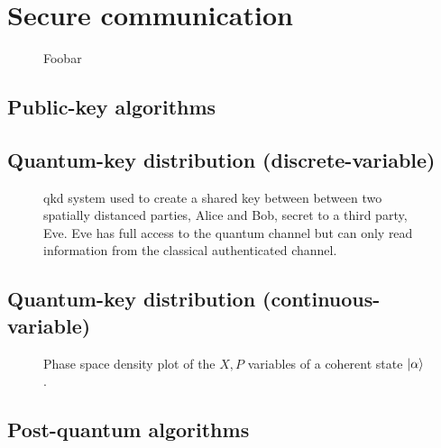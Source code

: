 \section{Secure communication}

\begin{figure}[htb]
	\centering
	
	\caption{Foobar}
\end{figure}


\subsection{Public-key algorithms}


\subsection{Quantum-key distribution (discrete-variable)}


\begin{figure}[htb]
	\centering
	
	\caption{\Gls{qkd} system used to create a shared key between between two spatially distanced parties, Alice and Bob, secret to a third party, Eve. Eve has full access to the quantum channel but can only read information from the classical authenticated channel.}
\end{figure}

\subsection{Quantum-key distribution (continuous-variable)}


\begin{figure}[htb]
	\centering
	
	\caption{Phase space density plot of the $X,P$ variables of a coherent state $\ket{\alpha}$.}
\end{figure}

\subsection{Post-quantum algorithms}